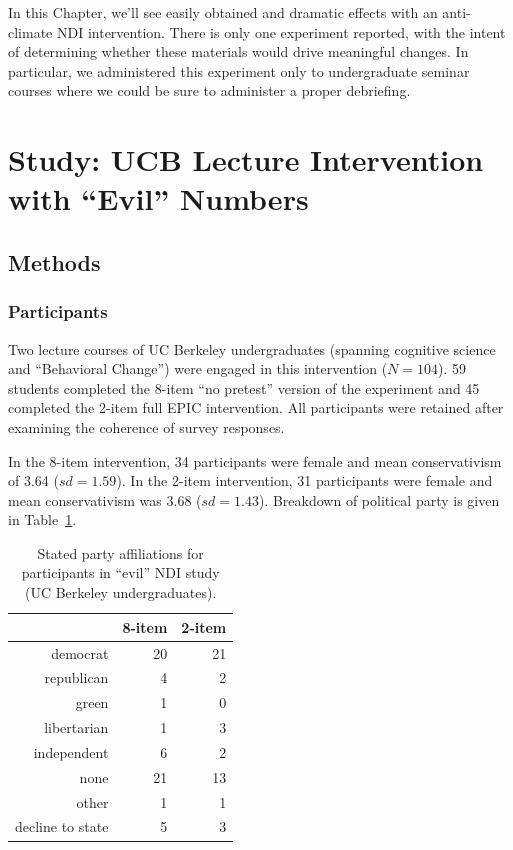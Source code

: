 In this Chapter, we'll see easily obtained and dramatic effects with an
anti-climate NDI intervention. There is only one experiment reported, with the
intent of determining whether these materials would drive meaningful
changes. In particular, we administered this experiment only to undergraduate
seminar courses where we could be sure to administer a proper debriefing.

\section{Study: UCB Lecture Intervention with \texorpdfstring{“Evil”}{"Evil"}
    Numbers}

\subsection{Methods} 
\label{sec:evilndi-methods}

\subsubsection{Participants}
\label{sec:evil-participants}

Two lecture courses of UC Berkeley undergraduates (spanning cognitive science and
“Behavioral Change”) were engaged in this intervention ($N=104$). 59 students
completed the 8-item “no pretest” version of the experiment and 45 completed
the 2-item full EPIC intervention. All participants were retained after
examining the coherence of survey responses.

In the 8-item intervention, 34 participants were female and mean conservativism
of 3.64 ($sd=1.59$). In the 2-item intervention, 31 participants were female and
mean conservativism was 3.68 ($sd=1.43$). Breakdown of political party is given
in Table~\ref{table:evil-party}.

\begin{table}[ht]
\caption{Stated party affiliations for participants in “evil” NDI study (UC
    Berkeley undergraduates).}
\label{table:evil-party}
\centering
\begin{tabular}{rrr}
  \toprule
     & 8-item & 2-item \\ 
  \midrule
  democrat &  20 &  21 \\ 
  republican &   4 &   2 \\ 
  green &   1 &   0 \\ 
  libertarian &   1 &   3 \\ 
  independent &   6 &   2 \\ 
  none &  21 &  13 \\ 
  other &   1 &   1 \\ 
  decline to state &   5 &   3 \\ 
   \bottomrule
\end{tabular}
\end{table}

